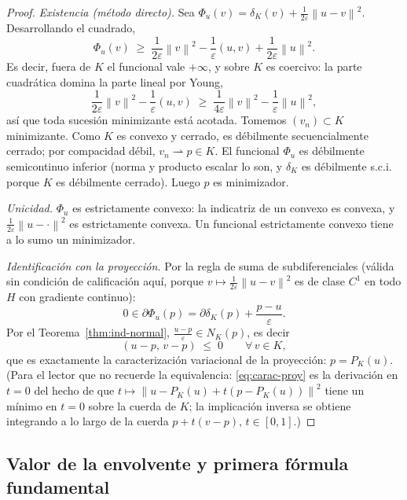 \documentclass[11pt,a4paper]{article}
\theoremstyle{definition}
\theoremstyle{remark}
\newcommand{\Norm}[1]{\left\lVert #1 \right\rVert}
\newcommand{\dk}{\delta_K}
\newcommand{\pk}{P_K}
\begin{document}
\begin{proof}
\emph{Existencia (método directo).} Sea
$\Phi_u(v) = \dk(v) + \frac{1}{2\varepsilon}\Norm{u-v}^2$.
Desarrollando el cuadrado,
\[
\Phi_u(v)
\;\ge\; \frac{1}{2\varepsilon}\Norm{v}^2
- \frac{1}{\varepsilon}(u, v)
+ \frac{1}{2\varepsilon}\Norm{u}^2 .
\]
Es decir, fuera de $K$ el funcional vale $+\infty$, y sobre $K$ es
coercivo: la parte cuadrática domina la parte lineal por Young,
\[
\frac{1}{2\varepsilon}\Norm{v}^2 - \frac{1}{\varepsilon}(u,v)
\;\ge\; \frac{1}{4\varepsilon}\Norm{v}^2 - \frac{1}{\varepsilon}\Norm{u}^2 ,
\]
así que toda sucesión minimizante está acotada. Tomemos $(v_n) \subset K$
minimizante. Como $K$ es convexo y cerrado, es débilmente secuencialmente
cerrado; por compacidad débil, $v_n \rightharpoonup p \in K$. El funcional
$\Phi_u$ es débilmente semicontinuo inferior (norma y producto escalar lo
son, y $\dk$ es débilmente s.c.i. porque $K$ es débilmente cerrado). Luego
$p$ es minimizador.

\smallskip
\emph{Unicidad.} $\Phi_u$ es estrictamente convexo: la indicatriz de un
convexo es convexa, y $\frac{1}{2\varepsilon}\Norm{u - \cdot}^2$ es
estrictamente convexa. Un funcional estrictamente convexo tiene a lo sumo un
minimizador.

\smallskip
\emph{Identificación con la proyección.} Por la regla de suma de
subdiferenciales (válida sin condición de calificación aquí, porque
$v \mapsto \frac{1}{2\varepsilon}\Norm{u-v}^2$ es de clase $C^1$ en todo
$H$ con gradiente continuo):
\[
0 \in \partial \Phi_u(p)
= \partial \dk(p) + \frac{p - u}{\varepsilon}.
\]
Por el Teorema~\ref{thm:ind-normal}, $\frac{u - p}{\varepsilon} \in N_K(p)$,
es decir
\begin{equation}\label{eq:carac-proy}
(u - p,\, v - p) \;\le\; 0 \qquad \forall\, v \in K,
\end{equation}
que es exactamente la caracterización variacional de la proyección:
$p = \pk(u)$. (Para el lector que no recuerde la equivalencia:
\eqref{eq:carac-proy} es la derivación en $t=0$ del hecho de que
$t \mapsto \Norm{u - \pk(u) + t(p - \pk(u))}^2$ tiene un mínimo en $t=0$
sobre la cuerda de $K$; la implicación inversa se obtiene integrando a lo
largo de la cuerda $p + t(v-p)$, $t\in[0,1]$.)
\end{proof}

\subsection{Valor de la envolvente y primera fórmula fundamental}
\end{document}
